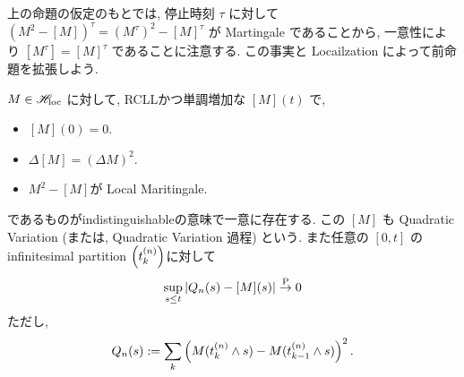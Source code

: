 \documentclass{ltjsarticle}
\begin{document}
上の命題の仮定のもとでは, 停止時刻 \( \tau \) に対して
\( ( M^2 - [M] )^{\tau} = ( M^{\tau} )^2 - [M]^{\tau} \) が Martingale であることから, 一意性により
\( [ M^{\tau} ] = [M]^{\tau} \)
であることに注意する.
この事実と Locailzation によって前命題を拡張しよう. 

\begin{thm}	\label{doob-mayer2}
	\( M \in \mathscr{H}_{\mathrm{loc}} \) に対して, RCLLかつ単調増加な \( [M](t) \) で, 
	\begin{itemize}
		\item	\( [M](0) = 0 \).
		\item	\( \Delta [M] = ( \Delta M )^2 \).
		\item	\( M^2 - [M] \)が Local Maritingale.
	\end{itemize}
	であるものがindistinguishableの意味で一意に存在する.
	この \( [M] \) も Quadratic Variation (または, Quadratic Variation 過程) という.
	また任意の \( [0,t] \) のinfinitesimal partition \( \left( t_k^{(n)} \right) \)に対して
	\begin{equation}		\label{Qnucp2}
		\sup_{ s \le t }| Q_n(s)-[M](s) | \stackrel{ \mathrm{P} }{ \to } 0
	\end{equation}
	ただし, 
	\[
		Q_n(s) := \sum_k \left(M ( t_k^{(n)} \wedge s ) - M ( t_{k-1}^{(n)} \wedge s ) \right)^2.
	\]
\end{thm}
\end{document}
